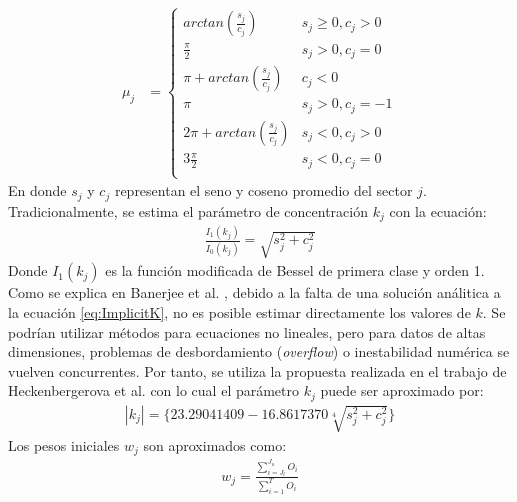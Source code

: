 \begin{align}\label{eq:Prevailing_Param}
    \mu_j &= 
        \left\{
            \begin{array}{ll}
                arctan(\frac{s_j}{c_j})  & s_j \geq 0, c_j > 0\\
                \frac{\pi}{2} & s_j > 0, c_j = 0\\
                \pi + arctan(\frac{s_j}{c_j}) & c_j < 0\\
                \pi & s_j > 0, c_j = -1\\
                2\pi + arctan(\frac{s_j}{c_j}) & s_j < 0, c_j > 0\\
                3\frac{\pi}{2} & s_j < 0, c_j = 0\\
            \end{array}
        \right.
\end{align}
En donde $s_j$ y $c_j$ representan el seno y coseno promedio del sector $j$.\\
Tradicionalmente, se estima el parámetro de concentración $k_j$ con la ecuación:
\begin{align}\label{eq:Implicit_Param}
    \frac{I_1(k_j)}{I_0(k_j)} = \sqrt{s_j^2 + c_j^2}
\end{align}
Donde $I_1(k_j)$ es la función modificada de Bessel de primera clase y orden 1.
 Como se explica en Banerjee et al. \cite{Banerjee05}, debido a la falta de una solución análitica a la ecuación \ref{eq:ImplicitK}, no es posible estimar directamente los valores de $k$. Se podrían utilizar métodos para ecuaciones no lineales, pero para datos de altas dimensiones, problemas de desbordamiento (\emph{overflow}) o inestabilidad numérica se vuelven concurrentes. Por tanto, se utiliza la propuesta realizada en el trabajo de Heckenbergerova et al. \cite{Heckenbergerova15} con lo cual el parámetro $k_j$ puede ser aproximado por:\\
\begin{align}
    |k_j| = \{23.29041409 - 16.8617370\sqrt[4]{s_j^2 + c_j^2}\} 
\end{align}
Los pesos iniciales $w_j$ son aproximados como: \\
\begin{align}\label{eq:Weight_Param}
    w_j = \frac{\sum_{i=J_l}^{J_u} O_i}{\sum_{i=1}^{T} O_i}
\end{align}

